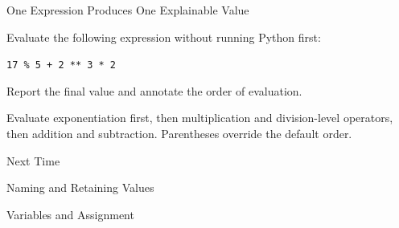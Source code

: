 \documentclass[aspectratio=169,10pt]{beamer}
\begin{document}
\begin{frame}{One Expression Produces One Explainable Value}

  \begin{activity}

    Evaluate the following expression without running Python first:

    \begin{center}

      {\LARGE \texttt{17 \% 5 + 2 ** 3 * 2}}

    \end{center}

    Report the final value and annotate the order of evaluation.

  \end{activity}

  \begin{keyidea}

    Evaluate exponentiation first, then multiplication and division-level operators, then addition and subtraction. Parentheses override the default order.

  \end{keyidea}

\end{frame}

\begin{frame}{Next Time}

  \begin{center}

    {\Huge Naming and Retaining Values}

    \vspace{0.20in}

    {\Large Variables and Assignment}

  \end{center}

\end{frame}
\end{document}
